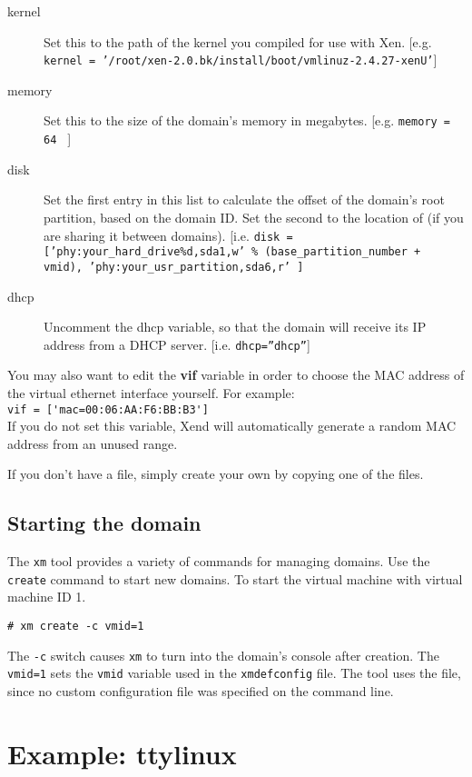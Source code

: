 \documentclass[11pt,twoside,final,openright]{xenstyle}
\begin{document}
\begin{description}
\item[kernel] Set this to the path of the kernel you compiled for use
              with Xen. [e.g. {\tt kernel =
              '/root/xen-2.0.bk/install/boot/vmlinuz-2.4.27-xenU'}]
\item[memory] Set this to the size of the domain's memory in
megabytes. [e.g. {\tt memory = 64 } ]
\item[disk] Set the first entry in this list to calculate the offset
of the domain's root partition, based on the domain ID.  Set the
second to the location of  (if you are sharing it between
domains). [i.e. {\tt disk = ['phy:your\_hard\_drive\%d,sda1,w' \%
(base\_partition\_number + vmid), 'phy:your\_usr\_partition,sda6,r' ]}
\item[dhcp] Uncomment the dhcp variable, so that the domain will
receive its IP address from a DHCP server. [i.e. {\tt dhcp=''dhcp''}]
\end{description}

You may also want to edit the {\bf vif} variable in order to choose
the MAC address of the virtual ethernet interface yourself.  For
example: \\ \verb_vif = ['mac=00:06:AA:F6:BB:B3']_\\ If you do not set
this variable, Xend will automatically generate a random MAC address
from an unused range.

If you don't have a  file, simply create your own 
by copying one of the  files.
\subsection{Starting the domain}

The {\tt xm} tool provides a variety of commands for managing domains.
Use the {\tt create} command to start new domains.  To start the
virtual machine with virtual machine ID 1.

\begin{verbatim}
# xm create -c vmid=1
\end{verbatim}

The {\tt -c} switch causes {\tt xm} to turn into the domain's console
after creation.  The {\tt vmid=1} sets the {\tt vmid} variable used in
the {\tt xmdefconfig} file.  The tool uses the
 file, since no custom configuration file
was specified on the command line.

\section{Example: ttylinux}
\end{document}

